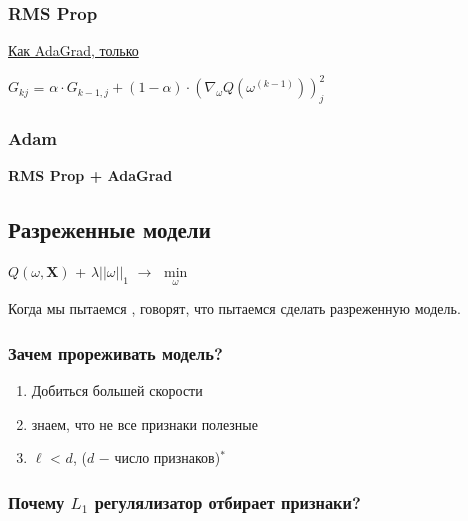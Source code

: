             \subsubsection{RMS Prop}
                \underline{Как AdaGrad, только}
                \begin{center}
                    $G_{kj}$ = $\alpha \cdot G_{k-1,j} + (1 - \alpha) \cdot (\nabla_\omega Q(\omega^{(k - 1)}) )_j^2$
                \end{center}

            
            \subsubsection{Adam}
            \begin{center}
                \textbf{RMS Prop + AdaGrad}
            \end{center}

            \subsection{Разреженные модели}
                \begin{center}
                    $Q(\omega, \mathbf{X})$ + $\lambda ||\omega||_1$ $\longrightarrow$ $\min\limits_\omega$
                \end{center}


                Когда мы пытаемся , говорят, что пытаемся сделать разреженную модель.

                \subsubsection{Зачем прореживать модель?}
                    \begin{enumerate}
                        \item Добиться большей скорости
                        \item знаем, что не все признаки полезные
                        \item $\ell$ < $d$, ($d$ $-$ число признаков)$^*$
                    \end{enumerate}

                \subsubsection{Почему $L_1$ регулялизатор отбирает признаки?}

